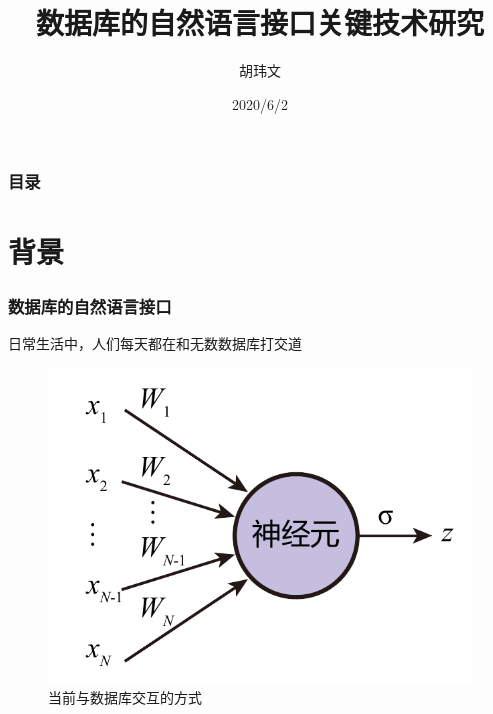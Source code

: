 \documentclass{ctexbeamer}
\title[数据库的自然语言接口]{数据库的自然语言接口关键技术研究}
\author{胡玮文}
\institute[SCUT]{华南理工大学}
\date{2020/6/2}
\begin{document}
\frame{\titlepage}
\logo{}



\begin{frame}
  \frametitle{目录}
  \tableofcontents

\end{frame}

\section{背景}
\begin{frame}
  \frametitle{数据库的自然语言接口}
  日常生活中，人们每天都在和无数数据库打交道
  \begin{figure}[]
    \includegraphics[page=12]{figure/figures.pdf}
    \caption{当前与数据库交互的方式}
  \end{figure}
\end{frame}
\end{document}
